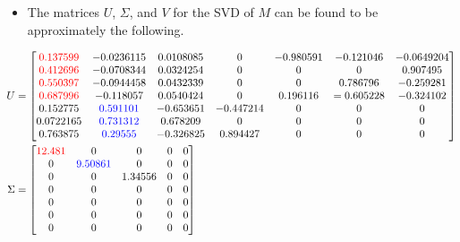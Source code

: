\documentclass{article}
\begin{document}
\begin{itemize}
\begin{center}
    \end{center}
    \begin{itemize}
        \item The matrices $U$, $\Sigma$, and $V$ for the SVD of $M$ can be found to be approximately the following.
    \end{itemize}
    \begin{align*}
        U &=
        \begin{bmatrix}
            \color{red} 0.137599 & -0.0236115 & 0.0108085 & 0 & -0.980591 & -0.121046 & -0.0649204\\
            \color{red} 0.412696 & -0.0708344 & 0.0324254 & 0 & 0 & 0 & 0.907495\\
            \color{red} 0.550397 & -0.0944458 & 0.0432339 & 0 & 0 & 0.786796 & -0.259281\\
            \color{red} 0.687996 & -0.118057 & 0.0540424 & 0 & 0.196116 & =0.605228 & -0.324102\\
            0.152775 & \color{blue} 0.591101 & -0.653651 & -0.447214 & 0 & 0 & 0\\
            0.0722165 & \color{blue}0.731312 & 0.678209 & 0 & 0 & 0 & 0\\
            0.763875 & \color{blue}0.29555 & -0.326825 & 0.894427 & 0 & 0 & 0\\
        \end{bmatrix}\\
        \Sigma &=
        \begin{bmatrix}
            \color{red} 12.481 & 0 & 0 & 0 & 0\\
            0 & \color{blue} 9.50861 & 0 & 0 & 0\\
            0 & 0 & 1.34556 & 0 & 0\\
            0 & 0 & 0 & 0 & 0\\
            0 & 0 & 0 & 0 & 0\\
            0 & 0 & 0 & 0 & 0\\
            0 & 0 & 0 & 0 & 0\\

\end{bmatrix}
\end{align*}
\end{itemize}
\end{document}
